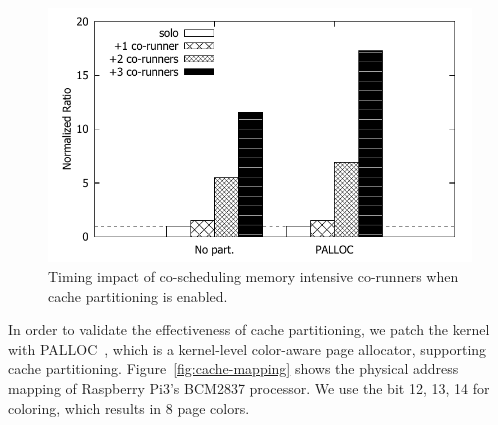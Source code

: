 \begin{figure}[h]
  \centering
  \includegraphics[width=.7\textwidth]{figs/palloc_bandwidth_exectime}
  \caption{Timing impact of co-scheduling memory intensive co-runners 
when cache partitioning is enabled.}
  \label{fig:palloc_bandwidth_exectime}
\end{figure}




In order to validate the effectiveness of cache partitioning, we patch
the kernel with PALLOC~\cite{yun2014rtas}, which is a kernel-level
color-aware page allocator, supporting cache partitioning. 
Figure~\ref{fig:cache-mapping} shows the physical address mapping of
Raspberry Pi3's BCM2837 processor. We use the bit 12, 13, 14 for
coloring, which results in 8 page colors.


